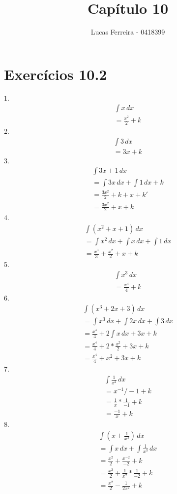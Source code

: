 \documentclass{article}
\title{Capítulo 10}
\author{Lucas Ferreira - 0418399}
\date{}
\begin{document}
\maketitle

\section{Exercícios 10.2}
1.
\begin{gather*}
    \int x \,dx
\\
    =\frac{x^2}{2} + k
\end{gather*}
2.
\begin{gather*}
    \int 3 \,dx
\\
    = 3x + k
\end{gather*}
3.
\begin{gather*}
    \int 3x + 1 \,dx
\\
    = \int 3x \,dx + \int 1 \,dx + k
\\
    = \frac{3x^2}{2} + k + x + k'
\\
    = \frac{3x^2}{2} + x + k
\end{gather*}
4.
\begin{gather*}
    \int (x^2 + x + 1) \,dx
\\
    = \int x^2 \,dx + \int x \,dx + \int 1 \,dx
\\
    = \frac{x^3}{3} +\frac{x^2}{2} + x + k
\end{gather*}
5.
\begin{gather*}
    \int x^3 \,dx
\\
    = \frac{x^4}{4} + k
\end{gather*}
6.
\begin{gather*}
    \int (x^3 + 2x + 3) \,dx
\\
    = \int x^3 \,dx + \int 2x \,dx + \int 3 \,dx
\\
    = \frac{x^4}{4} + 2\int x \,dx + 3x + k
\\
    = \frac{x^4}{4} + 2 * \frac{x^2}{2} + 3x + k
\\
    = \frac{x^4}{4} + x^2 + 3x + k
\end{gather*}
7.
\begin{gather*}
    \int \frac{1}{x^2} \,dx
\\
    = x^{-1}/-1 + k
\\
    = \frac{1}{x} * \frac{1}{-1} + k
\\
    = \frac{-1}{x} + k
\end{gather*}
8.
\begin{gather*}
    \int (x + \frac{1}{x^3}) \,dx
\\
    = \int x \,dx + \int \frac{1}{x^3} \,dx
\\
    = \frac{x^2}{2} + \frac{x^{-2}}{-2} + k
\\
    = \frac{x^2}{2} + \frac{1}{x^2} * \frac{1}{-2} + k
\\
    = \frac{x^2}{2} - \frac{1}{2x^2} + k
\end{gather*}
\end{document}
